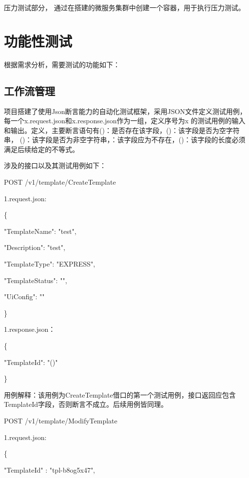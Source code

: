 压力测试部分， 通过在搭建的微服务集群中创建一个容器，用于执行压力测试\cite{zw4}。


\section{功能性测试}
根据需求分析，需要测试的功能如下：

\subsection{工作流管理}

项目搭建了使用Json断言能力的自动化测试框架，采用JSON文件定义测试用例，每一个x.request.json和x.response.json作为一组，定义序号为x
的测试用例的输入和输出。定义，主要断言语句有\@exists()：是否存在该字段，\@isEmpty()：该字段是否为空字符串，
\@notEmpty()：该字段是否为非空字符串，\@notExists：该字段应为不存在，\@len()：该字段的长度必须满足后续给定的不等式。

涉及的接口以及其测试用例如下：

POST /v1/template/CreateTemplate

1.request.json:

\{

"TemplateName": "test",

"Description": "test",

"TemplateType": "EXPRESS",


"TemplateStatus": "",

"UiConfig": ""

\}

1.response.json：

\{

"TemplateId": "\@exists()"

\}

用例解释：该用例为CreateTemplate借口的第一个测试用例，接口返回应包含TemplateId字段，否则断言不成立。后续用例皆同理。

POST /v1/template/ModifyTemplate

1.request.json:

\{

"TemplateId"          : "tpl-b8og5x47",

